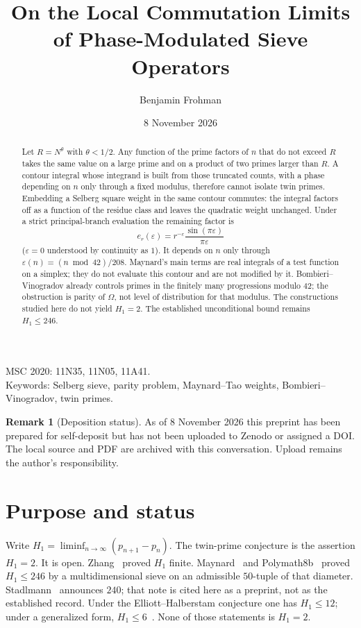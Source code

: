 \documentclass[11pt,a4paper]{article}
\title{On the Local Commutation Limits\\ of Phase-Modulated Sieve Operators}
\author{Benjamin Frohman}
\date{8 November 2026}
\theoremstyle{plain}
\theoremstyle{definition}
\newtheorem{remark}{Remark}
\theoremstyle{plain}
\numberwithin{equation}{section}
\begin{document}
\maketitle

\begin{abstract}
Let \(R=N^{\theta}\) with \(\theta<1/2\). Any function of the prime factors of \(n\) that do not exceed \(R\) takes the same value on a large prime and on a product of two primes larger than \(R\). A contour integral whose integrand is built from those truncated counts, with a phase depending on \(n\) only through a fixed modulus, therefore cannot isolate twin primes. Embedding a Selberg square weight in the same contour commutes: the integral factors off as a function of the residue class and leaves the quadratic weight unchanged. Under a strict principal-branch evaluation the remaining factor is
\[
e_r(\varepsilon)=r^{-\varepsilon}\frac{\sin(\pi\varepsilon)}{\pi\varepsilon}
\]
(\(\varepsilon=0\) understood by continuity as \(1\)). It depends on \(n\) only through \(\varepsilon(n)=(n\bmod 42)/208\). Maynard's main terms are real integrals of a test function on a simplex; they do not evaluate this contour and are not modified by it. Bombieri--Vinogradov already controls primes in the finitely many progressions modulo \(42\); the obstruction is parity of \(\Omega\), not level of distribution for that modulus. The constructions studied here do not yield \(H_1=2\). The established unconditional bound remains \(H_1\le 246\).
\end{abstract}

\noindent
MSC 2020: 11N35, 11N05, 11A41.\\
Keywords: Selberg sieve, parity problem, Maynard--Tao weights, Bombieri--Vinogradov, twin primes.


\begin{remark}[Deposition status]
As of 8 November 2026 this preprint has been prepared for self-deposit but has not been uploaded to Zenodo or assigned a DOI. The local source and PDF are archived with this conversation. Upload remains the author's responsibility.
\end{remark}

\section{Purpose and status}

Write \(H_1=\liminf_{n\to\infty}(p_{n+1}-p_n)\). The twin-prime conjecture is the assertion \(H_1=2\). It is open. Zhang~\cite{Zhang2013} proved \(H_1\) finite. Maynard~\cite{Maynard2015} and Polymath8b~\cite{Polymath8b} proved \(H_1\le 246\) by a multidimensional sieve on an admissible \(50\)-tuple of that diameter. Stadlmann~\cite{Stadlmann2026} announces \(240\); that note is cited here as a preprint, not as the established record. Under the Elliott--Halberstam conjecture one has \(H_1\le 12\); under a generalized form, \(H_1\le 6\)~\cite{Maynard2015,Polymath8b}. None of those statements is \(H_1=2\).
\end{document}
